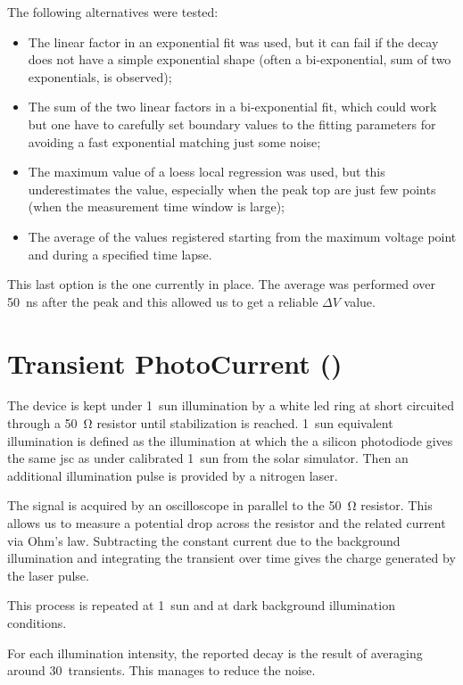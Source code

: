 The following alternatives were tested:
\begin{itemize}
	\item The linear factor in an exponential fit was used, but it can fail if the decay does not have a simple exponential shape (often a bi-exponential, sum of two exponentials, is observed);
	\item The sum of the two linear factors in a bi-exponential fit, which could work but one have to carefully set boundary values to the fitting parameters for avoiding a fast exponential matching just some noise;
	\item The maximum value of a \gls{loess} local regression was used, but this underestimates the value, especially when the peak top are just few points (when the measurement time window is large);
	\item The average of the values registered starting from the maximum voltage point and during a specified time lapse.
\end{itemize}

This last option is the one currently in place. The average was performed over \SI{50}{ns} after the peak and this allowed us to get a reliable $\Delta V$ value.

\section{Transient PhotoCurrent ()}

The device is kept under 1~sun illumination by a white \gls{led} ring at short circuited through a \SI{50}{\ohm} resistor until stabilization is reached. 1~sun equivalent illumination is defined as the illumination at which the a silicon photodiode gives the same \gls{jsc} as under calibrated 1~sun from the solar simulator. Then an additional illumination pulse is provided by a nitrogen laser.

The signal is acquired by an oscilloscope in parallel to the \SI{50}{\ohm} resistor. This allows us to measure a potential drop across the resistor and the related current via Ohm's law. Subtracting the constant current due to the background illumination and integrating the transient over time gives the charge generated by the laser pulse.

This process is repeated at 1~sun and at dark background illumination conditions.

For each illumination intensity, the reported decay is the result of averaging around 30~transients. This manages to reduce the noise.

